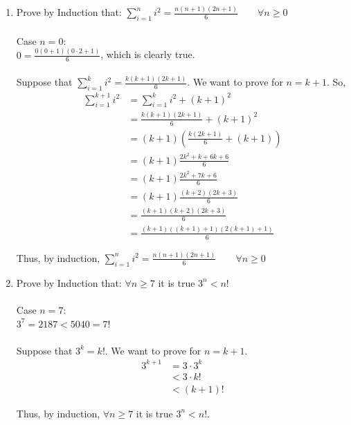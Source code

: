 \documentclass{article}
\begin{document}
\begin{enumerate}
  \item Prove by Induction that:
  \( \sum_{i=1}^{n}i^2=\frac{n(n+1)(2n+1)}{6} \qquad\forall n \geq 0\)
    \\
    \\
    Case $n=0$: \\
    $0 = \frac{0(0+1)(0\cdot 2+1)}{6}$, which is clearly true.
    \\
    \\
    Suppose that $\sum_{i=1}^{k} i^2 = \frac{k(k+1)(2k+1)}{6}$. We want to prove for $n=k+1$. So,
    \begin{equation*}
    \begin{split}
        \sum_{i=1}^{k+1} i^2 &= \sum_{i=1}^{k} i^2 + (k+1)^2 \\
         & = \frac{k(k+1)(2k+1)}{6} + (k+1)^2 \\
         & = (k+1)(\frac{k(2k+1)}{6} + (k+1)) \\
         & = (k+1)\frac{2k^2+k+6k+6}{6} \\
         & = (k+1)\frac{2k^2+7k+6}{6} \\
         & = (k+1)\frac{(k+2)(2k+3)}{6} \\
         & = \frac{(k+1)(k+2)(2k+3)}{6} \\ 
         & = \frac{(k+1)((k+1)+1)(2(k+1)+1)}{6} 
    \end{split}
    \end{equation*}
    
    Thus, by induction, \( \sum_{i=1}^{n}i^2=\frac{n(n+1)(2n+1)}{6} \qquad\forall n \geq 0\)
    \\
  \item Prove by Induction that:
  $\forall n \geq 7$ it is true $3^n<n!$
  \\
  \\
  Case $n=7$: \\
  $3^7 = 2187 < 5040 = 7!$
  \\
  \\
  Suppose that $3^k=k!$. We want to prove for $n=k+1$.
  \begin{equation*}
    \begin{split}
        3^{k+1} & = 3\cdot 3^k \\
        & < 3\cdot k! \\
        & < (k+1)!
    \end{split}
  \end{equation*}
  
  Thus, by induction, $\forall n \geq 7$ it is true $3^n<n!$.
  \\
  

\end{enumerate}
\end{document}
